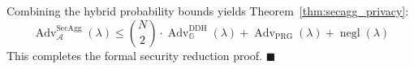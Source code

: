 Combining the hybrid probability bounds yields Theorem~\ref{thm:secagg_privacy}:
\begin{equation}
    \operatorname{Adv}_{\mathcal{A}}^{\text{SecAgg}}(\lambda) \le \binom{N}{2} \cdot \operatorname{Adv}_{\mathbb{G}}^{\text{DDH}}(\lambda) + \operatorname{Adv}_{\operatorname{PRG}}(\lambda) + \operatorname{negl}(\lambda)
\end{equation}
This completes the formal security reduction proof. \hfill $\blacksquare$
